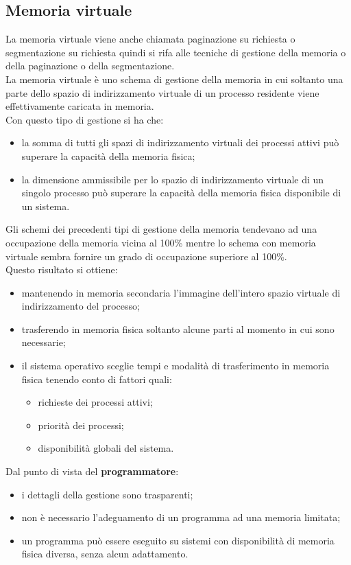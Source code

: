 \documentclass[12pt, letterpaper]{report}
\begin{document}
	\subsection{Memoria virtuale}
	La memoria virtuale viene anche chiamata paginazione su richiesta o segmentazione su richiesta quindi si rifa alle tecniche di gestione della memoria o della paginazione o della segmentazione. \\
	La memoria virtuale è uno schema di gestione della memoria in cui soltanto una parte dello spazio di indirizzamento virtuale di un processo residente viene effettivamente caricata in memoria. \\
	Con questo tipo di gestione si ha che:
	\begin{itemize}
		\item la somma di tutti gli spazi di indirizzamento virtuali dei processi attivi può superare la capacità della memoria fisica;
		\item la dimensione ammissibile per lo spazio di indirizzamento virtuale di un singolo processo può superare la capacità della memoria fisica disponibile di un sistema.
	\end{itemize}
	Gli schemi dei precedenti tipi di gestione della memoria tendevano ad una occupazione della memoria vicina al 100\% mentre lo schema con memoria virtuale sembra fornire un grado di occupazione superiore al 100\%. \\
	Questo risultato si ottiene:
	\begin{itemize}
		\item mantenendo in memoria secondaria l'immagine dell'intero spazio virtuale di indirizzamento del processo;
		\item trasferendo in memoria fisica soltanto alcune parti al momento in cui sono necessarie;
		\item il sistema operativo sceglie tempi e modalità di trasferimento in memoria fisica tenendo conto di fattori quali:
		\begin{itemize}
			\item richieste dei processi attivi;
			\item priorità dei processi;
			\item disponibilità globali del sistema.
		\end{itemize}
	\end{itemize}
	Dal punto di vista del \textbf{programmatore}:
	\begin{itemize}
		\item i dettagli della gestione sono trasparenti;
		\item non è necessario l'adeguamento di un programma ad una memoria limitata;
		\item un programma può essere eseguito su sistemi con disponibilità di memoria fisica diversa, senza alcun adattamento.
	\end{itemize}
\end{document}
